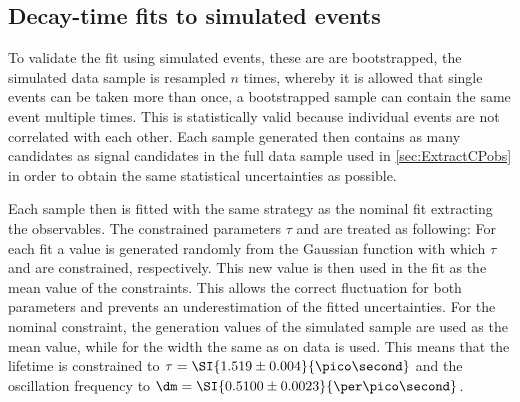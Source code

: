 \subsection{Decay-time fits to simulated events}
\label{sec:valOnSim}

To validate the fit using simulated events, these are are bootstrapped, \ie the simulated data sample is resampled $n$ times, whereby it is allowed that single events can be taken more than once, \eg a bootstrapped sample can contain the same event multiple times.
This is statistically valid because individual events are not correlated with each other.
Each sample generated then contains as many candidates as signal candidates in the full \BdToDpi data sample used in \cref{sec:ExtractCPobs} in order to obtain the same statistical uncertainties as possible.

Each sample then is fitted with the same strategy as the nominal fit extracting the \CP observables.
The constrained parameters $\tau$ and \dm are treated as following:
For each fit a value is generated randomly from the Gaussian function with which $\tau$ and \dm are constrained, respectively.
This new value is then used in the fit as the mean value of the constraints.
This allows the correct fluctuation for both parameters and prevents an underestimation of the fitted uncertainties.
For the nominal constraint, the generation values of the simulated sample are used as the mean value, while for the width the same as on data is used.
This means that the lifetime is constrained to $\tau=\SI{1.519\pm0.004}{\pico\second}$ and the oscillation frequency to $\dm=\SI{0.5100\pm0.0023}{\per\pico\second}$.

